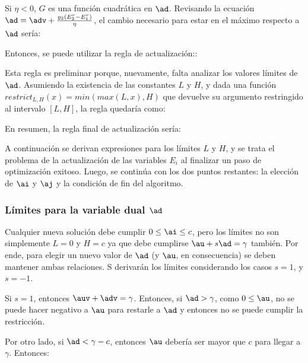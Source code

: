 \ma{
\ad \ass  \updatezeta
}
   
Si $\eta <0$, $G$ es una función cuadrática en $\ad$. Revisando la ecuación $\adadvequation{}$, el cambio necesario para estar en el máximo respecto a $\ad$ sería:


Entonces, se puede utilizar la regla de actualización:: 

\ma{\ad \ass \adv+ \Delta \ad}

Esta regla es preliminar porque, nuevamente, falta analizar los valores límites de $\ad$. Asumiendo la existencia de las constantes $L$ y $H$, y dada una función $restrict_{L,H}(x) = min(max(L,x),H)$ que devuelve su argumento restringido al intervalo $[L,H]$, la regla quedaría como:

\ma{\ad \ass \updateneta}

En resumen, la regla final de actualización sería:


A continuación se derivan expresiones para los límites $L$ y $H$, y se trata el problema de la actualización de las variables $E_i$ al finalizar un paso de optimización exitoso. Luego, se continúa con los dos puntos restantes: la elección de $\ai$ y $\aj$ y la condición de fin del algoritmo.

\subsubsection{Límites para la variable dual $\ad$}

Cualquier nueva solución debe cumplir $0 \leq \ai \leq c$, pero los límites no son simplemente $L=0$ y $H=c$ ya que debe cumplirse  $\au+s \ad = \gamma$ también. Por ende, para elegir un nuevo valor de $\ad$ (y $\au$, en consecuencia) se deben mantener ambas relaciones. S derivarán los límites considerando los casos $s=1$, y $s=-1$.

Si $s=1$, entonces $\auv+\adv=\gamma$. Entonces, si $\ad>\gamma$, como $0 \leq \au$, no se puede hacer negativo a $\au$ para restarle a $\ad$ y entonces no se puede cumplir la restricción.

Por otro lado, si $\ad < \gamma-c$, entonces $\au$ debería ser mayor que $c$ para llegar a $\gamma$. Entonces:



